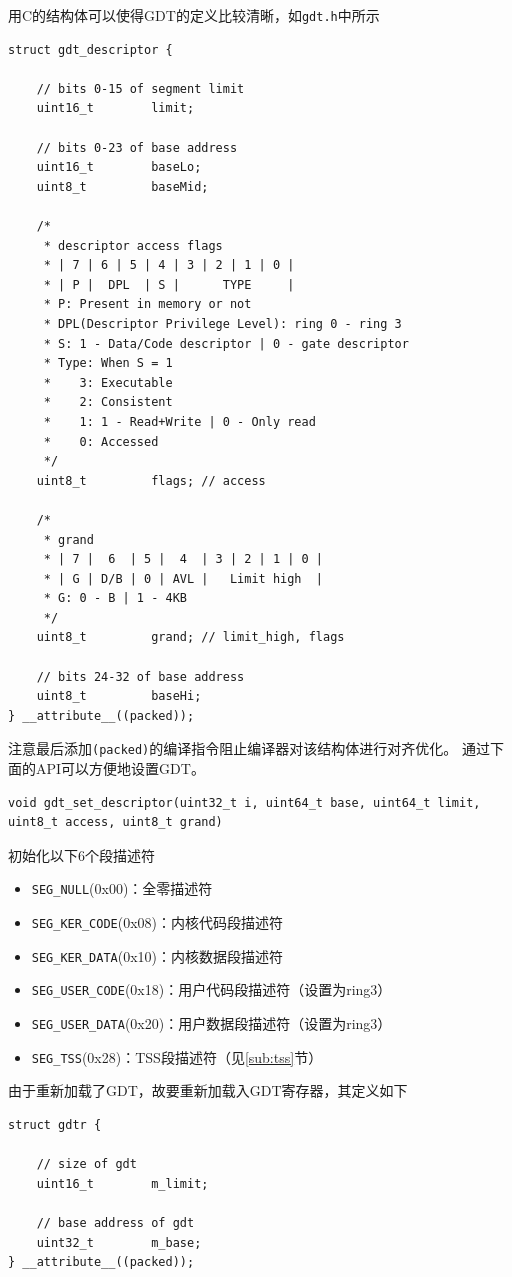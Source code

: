 \documentclass[logo,reportComp]{thesis}
\begin{document}
用C的结构体可以使得GDT的定义比较清晰，如\verb'gdt.h'中所示
\begin{lstlisting}
struct gdt_descriptor {

	// bits 0-15 of segment limit
	uint16_t		limit;

	// bits 0-23 of base address
	uint16_t		baseLo;
	uint8_t			baseMid;

	/*
	 * descriptor access flags
	 * | 7 | 6 | 5 | 4 | 3 | 2 | 1 | 0 |
	 * | P |  DPL  | S |      TYPE     |
	 * P: Present in memory or not
	 * DPL(Descriptor Privilege Level): ring 0 - ring 3
	 * S: 1 - Data/Code descriptor | 0 - gate descriptor
	 * Type: When S = 1
	 *    3: Executable
	 *    2: Consistent
	 *    1: 1 - Read+Write | 0 - Only read
	 *    0: Accessed
	 */
	uint8_t			flags; // access

	/*
	 * grand
	 * | 7 |  6  | 5 |  4  | 3 | 2 | 1 | 0 |
	 * | G | D/B | 0 | AVL |   Limit high  |
	 * G: 0 - B | 1 - 4KB
	 */
	uint8_t			grand; // limit_high, flags

	// bits 24-32 of base address
	uint8_t			baseHi;
} __attribute__((packed));
\end{lstlisting}

注意最后添加\verb'(packed)'的编译指令阻止编译器对该结构体进行对齐优化。
通过下面的API可以方便地设置GDT。
\begin{lstlisting}
void gdt_set_descriptor(uint32_t i, uint64_t base, uint64_t limit, uint8_t access, uint8_t grand)
\end{lstlisting}

初始化以下6个段描述符
\begin{itemize}
	\item \verb'SEG_NULL'(0x00)：全零描述符
	\item \verb'SEG_KER_CODE'(0x08)：内核代码段描述符
	\item \verb'SEG_KER_DATA'(0x10)：内核数据段描述符
	\item \verb'SEG_USER_CODE'(0x18)：用户代码段描述符（设置为ring3）
	\item \verb'SEG_USER_DATA'(0x20)：用户数据段描述符（设置为ring3）
	\item \verb'SEG_TSS'(0x28)：TSS段描述符（见\ref{sub:tss}节）
\end{itemize}

由于重新加载了GDT，故要重新加载入GDT寄存器，其定义如下
\begin{lstlisting}
struct gdtr {

	// size of gdt
	uint16_t		m_limit;

	// base address of gdt
	uint32_t		m_base;
} __attribute__((packed));
\end{lstlisting}
\end{document}
